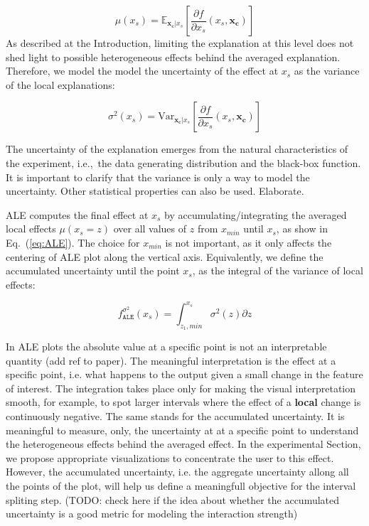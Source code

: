\documentclass[twoside]{article}
\newcommand{\dfdx}{\frac{\partial f}{\partial x_s}}
\newcommand{\xc}{\mathbf{x_c}}
\begin{document}
\begin{equation}
  \label{eq:ALE_mean}
  \mu(x_s) = \mathbb{E}_{\xc|x_s}\left [\dfdx (x_s, \xc)\right ]
\end{equation}
%
As described at the Introduction, limiting the explanation at this
level does not shed light to possible heterogeneous effects behind the
averaged explanation. Therefore, we model the model the uncertainty of
the effect at \(x_s\) as the variance of the local explanations:

\begin{equation}
  \label{eq:ALE_var}
  \sigma^2(x_s) = \mathrm{Var}_{\xc|x_s}\left [\dfdx (x_s, \xc) \right ]
\end{equation}

\noindent
%
The uncertainty of the explanation emerges from the natural
characteristics of the experiment, i.e.,~the data generating
distribution and the black-box function. It is important to clarify
that the variance is only a way to model the uncertainty. Other
statistical properties can also be used. Elaborate.

ALE computes the final effect at \(x_s\) by accumulating/integrating
the averaged local effects \(\mu (x_s=z) \) over all values of \(z\)
from \(x_{min}\) until \(x_s\), as show in Eq.~(\ref{eq:ALE}). The
choice for \(x_{min}\) is not important, as it only affects the
centering of ALE plot along the vertical axis. Equivalently, we define
the accumulated uncertainty until the point \(x_s\), as the integral
of the variance of local effects:

\begin{equation}
  \label{eq:3}
  f_{\mathtt{ALE}}^{\sigma^2}(x_s) = \int_{z_1, min}^{x_s} \sigma^2(z) \partial z
\end{equation}


In ALE plots the absolute value at a specific point is not an
interpretable quantity (add ref to paper). The meaningful
interpretation is the effect at a specific point, i.e. what happens to
the output given a small change in the feature of interest. The
integration takes place only for making the visual interpretation
smooth, for example, to spot larger intervals where the effect of a
\textbf{local} change is continuously negative. The same stands for
the accumulated uncertainty. It is meaningful to measure, only, the
uncertainty at at a specific point to understand the heterogeneous
effects behind the averaged effect. In the experimental Section, we
propose appropriate visualizations to concentrate the user to this
effect. However, the accumulated uncertainty, i.e. the aggregate
uncertainty allong all the points of the plot, will help us define a
meaningfull objective for the interval spliting step. (TODO: check
here if the idea about whether the accumulated uncertainty is a good
metric for modeling the interaction strength)
\end{document}
